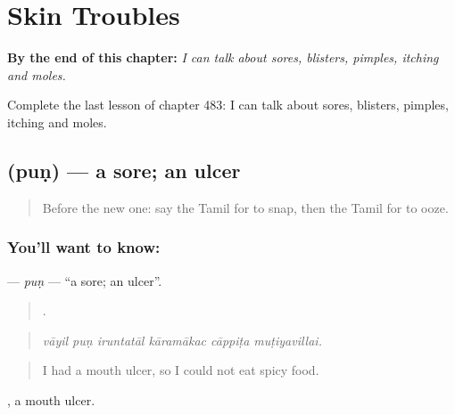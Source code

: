 
\chapter{Skin Troubles}
\label{ch:ta-skin-troubles}

\begin{chapteropening}
\textbf{By the end of this chapter:} \emph{I can talk about sores, blisters, pimples, itching and moles.}

Complete the last lesson of chapter 483: I can talk about sores, blisters, pimples, itching and moles.
\end{chapteropening}

\section[\texorpdfstring{\ta{புண்} (puṇ)}{புண் (puṇ)}]{ (puṇ) — a sore; an ulcer}

\label{lesson:TA-C483-pun}



\begin{quote}
Before the new one: say the Tamil for to snap, then the Tamil for to ooze.
\end{quote}

\subsection*{You'll want to know: }
\textbf{} — \emph{puṇ} — \textquotedblleft{}a sore; an ulcer\textquotedblright{}.

\begin{quote}
     .
\end{quote}

\begin{quote}
\emph{vāyil puṇ iruntatāl kāramākac cāppiṭa muṭiyavillai.}
\end{quote}

\begin{quote}
I had a mouth ulcer, so I could not eat spicy food.
\end{quote}

 , a mouth ulcer.


